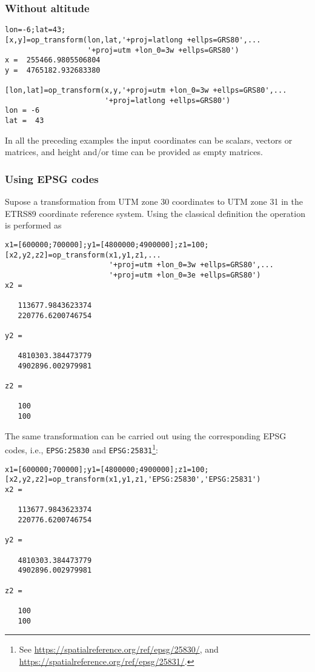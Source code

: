 \documentclass[10pt,a4paper]{article}
\begin{document}
\subsubsection{Without altitude}

\begin{verbatim}
lon=-6;lat=43;
[x,y]=op_transform(lon,lat,'+proj=latlong +ellps=GRS80',...
                   '+proj=utm +lon_0=3w +ellps=GRS80')
x =  255466.9805506804
y =  4765182.932683380

[lon,lat]=op_transform(x,y,'+proj=utm +lon_0=3w +ellps=GRS80',...
                       '+proj=latlong +ellps=GRS80')
lon = -6
lat =  43
\end{verbatim}

In all the preceding examples the input coordinates can be scalars, vectors or
matrices, and height and/or time can be provided as empty matrices.

\subsubsection{Using EPSG codes}

Supose a transformation from UTM zone 30 coordinates to UTM zone 31 in the
ETRS89 coordinate reference system. Using the classical definition the operation
is performed as

\begin{verbatim}
x1=[600000;700000];y1=[4800000;4900000];z1=100;
[x2,y2,z2]=op_transform(x1,y1,z1,...
                        '+proj=utm +lon_0=3w +ellps=GRS80',...
                        '+proj=utm +lon_0=3e +ellps=GRS80')
x2 =

   113677.9843623374
   220776.6200746754

y2 =

   4810303.384473779
   4902896.002979981

z2 =

   100
   100
\end{verbatim}

The same transformation can be carried out using the corresponding EPSG
codes, i.e., \texttt{EPSG:25830} and
\texttt{EPSG:25831}\footnote{See
\url{https://spatialreference.org/ref/epsg/25830/},
and \url{https://spatialreference.org/ref/epsg/25831/}.}:

\begin{verbatim}
x1=[600000;700000];y1=[4800000;4900000];z1=100;
[x2,y2,z2]=op_transform(x1,y1,z1,'EPSG:25830','EPSG:25831')
x2 =

   113677.9843623374
   220776.6200746754

y2 =

   4810303.384473779
   4902896.002979981

z2 =

   100
   100
\end{verbatim}
\end{document}
